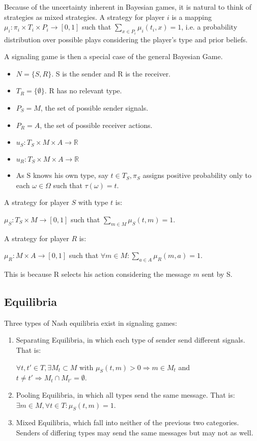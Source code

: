 \documentclass{article}
\begin{document}
\noindent Because of the uncertainty inherent in Bayesian games, it is natural to think of strategies as mixed strategies. A strategy for player $i$ is a mapping $\mu_i: \pi_i \times T_i \times P_i \to [0,1]$ such that $\sum_{x \in P_i} \mu_i(t_i, x) = 1$, i.e. a probability distribution over possible plays considering the player's type and prior beliefs.

\noindent A signaling game is then a special case of the general Bayesian Game.

\begin{itemize}
\item $N = \{S, R\}$. S is the sender and R is the receiver.
\item $T_{R} = \{\emptyset\}$. R has no relevant type.
\item $P_{S} = M$, the set of possible sender signals.
\item $P_{R} = A$, the set of possible receiver actions. 
\item $u_{S}: T_{S} \times M \times A \to \mathbb{R}$
\item $u_{R}: T_{S} \times M \times A \to \mathbb{R}$
\item As S knows his own type, say $t \in T_{S}, \pi_{S}$ assigns positive probability only to each $\omega \in \Omega$ such that $\tau(\omega) = t$.
\end{itemize}

\noindent A strategy for player $S$ with type $t$ is:

$\mu_S: T_S \times M \to [0,1]$ such that $\sum_{m \in M} \mu_S(t, m) = 1$.

\noindent A strategy for player $R$ is:

$\mu_R: M \times A \to [0,1]$ such that $\forall m 
\in M: \sum_{a \in A} \mu_R(m, a) = 1$.

\noindent This is because R selects his action considering the message $m$ sent by S.

\subsection{Equilibria}

Three types of Nash equilibria exist in signaling games:

\begin{enumerate}
\item Separating Equilibria, in which each type of sender send different signals. That is:

$\forall t, t' \in T, \exists M_{t} \subset M$ with $\mu_S(t,m) > 0 \Rightarrow m \in M_{t}$ and $t \ne t' \Rightarrow M_{t} \cap M_{t'} = \emptyset$.

\item Pooling Equilibria, in which all types send the same message. That is: $\exists  m \in M, \forall t \in T : \mu_S(t,m) = 1$.

\item Mixed Equilibria, which fall into neither of the previous two categories. Senders of differing types may send the same messages but may not as well. 
\end{enumerate}
\end{document}
